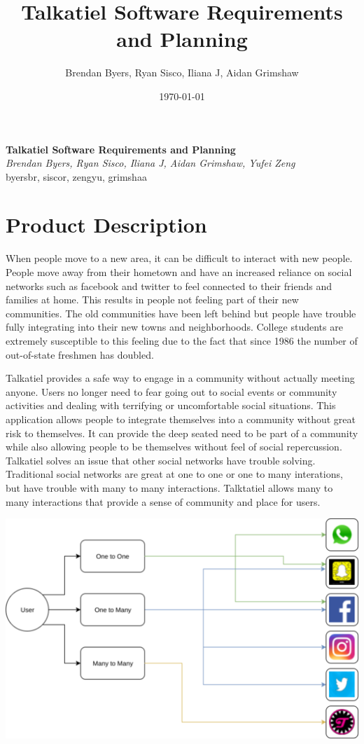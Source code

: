 \documentclass[12pt]{article}
\title{Talkatiel Software Requirements and Planning}
\author{Brendan Byers, Ryan Sisco, Iliana J, Aidan Grimshaw}
\date{\today}
\begin{document}
\begin{center}
      \Large\textbf{Talkatiel Software Requirements and Planning}\\
      \large\textit{Brendan Byers, Ryan Sisco, Iliana J, Aidan Grimshaw, Yufei Zeng}\\
      \large{byersbr, siscor, zengyu, grimshaa}\\
   \end{center}

\section{Product Description}
  When people move to a new area, it can be difficult to interact with new people.  People move away from their hometown and have an increased reliance on social networks such as facebook and twitter to feel connected to their friends and families at home.  This results in people not feeling part of their new communities.  The old communities have been left behind but people have trouble fully integrating into their new towns and neighborhoods.  College students are extremely susceptible to this feeling due to the fact that since 1986 the number of out-of-state freshmen has doubled\cite{item2}.

  Talkatiel provides a safe way to engage in a community without actually meeting anyone.  Users no longer need to fear going out to social events or community activities and dealing with terrifying or uncomfortable social situations.  This application allows people to integrate themselves into a community without great risk to themselves.  It can provide the deep seated need to be part of a community while also allowing people to be themselves without feel of social repercussion.  Talkatiel solves an issue that other social networks have trouble solving.  Traditional social networks are great at one to one or one to many interations, but have trouble with many to many interactions.  Talktatiel allows many to many interactions that provide a sense of community and place for users.
  
  \includegraphics{similarServices}
\end{document}
